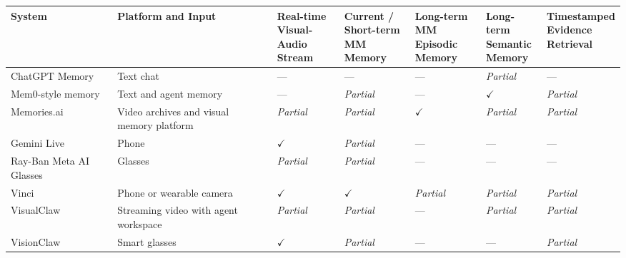 \newcommand{\cmark}{\(\checkmark\)}
\newcommand{\xmark}{---}
\newcommand{\pmark}{\emph{Partial}}

\begin{table}[t]
\centering
\scriptsize
\setlength{\tabcolsep}{2.5pt}
\renewcommand{\arraystretch}{1.15}
\begin{tabularx}{\textwidth}{@{}
>{\raggedright\arraybackslash}p{}
>{\raggedright\arraybackslash}p{}
*{5}{>{\centering\arraybackslash}X}
@{}}
\toprule
\textbf{System} &
\textbf{Platform and Input} &
\makecell{\textbf{Real-time}\\\textbf{Visual-Audio}\\\textbf{Stream}} &
\makecell{\textbf{Current /}\\\textbf{Short-term}\\\textbf{MM Memory}} &
\makecell{\textbf{Long-term}\\\textbf{MM Episodic}\\\textbf{Memory}} &
\makecell{\textbf{Long-term}\\\textbf{Semantic}\\\textbf{Memory}} &
\makecell{\textbf{Timestamped}\\\textbf{Evidence}\\\textbf{Retrieval}} \\
\midrule

ChatGPT Memory &
Text chat &
\xmark &
\xmark &
\xmark &
\pmark &
\xmark \\

Mem0-style memory &
Text and agent memory &
\xmark &
\pmark &
\xmark &
\cmark &
\pmark \\

Memories.ai &
Video archives and visual memory platform &
\pmark &
\pmark &
\cmark &
\pmark &
\pmark \\

Gemini Live &
Phone &
\cmark &
\pmark &
\xmark &
\xmark &
\xmark \\

Ray-Ban Meta AI Glasses &
Glasses &
\pmark &
\pmark &
\xmark &
\xmark &
\xmark \\

Vinci &
Phone or wearable camera &
\cmark &
\cmark &
\pmark &
\pmark &
\pmark \\

VisualClaw &
Streaming video with agent workspace &
\pmark &
\pmark &
\xmark &
\pmark &
\pmark \\

VisionClaw &
Smart glasses &
\cmark &
\pmark &
\xmark &
\xmark &
\pmark \\


\end{tabularx}
\end{table}
